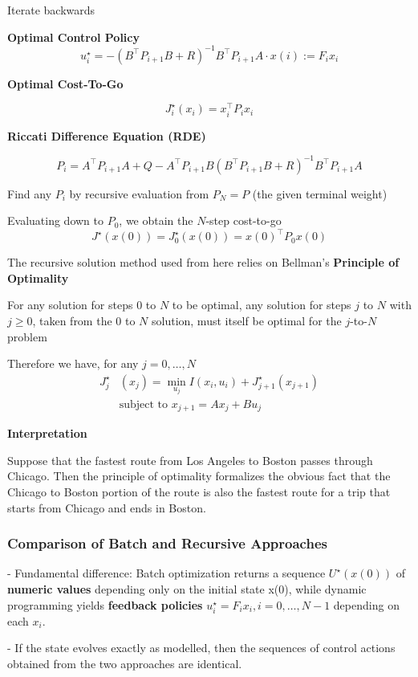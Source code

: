 Iterate backwards

\textbf{Optimal Control Policy}
\[
	u_i^\star =
	-(B^\top P_{i+1}B + R)^{-1}
	B^\top P_{i+1} A \cdot x(i)
	:= F_i x_i
\]

\textbf{Optimal Cost-To-Go}

\[
	J_i^\star(x_i) = x_i^\top P_i x_i
\]


\textbf{Riccati Difference Equation (RDE)}

\[
	\scriptstyle
	P_i = A^\top P_{i+1} A
	+ Q - A^\top P_{i+1} B
	(B^\top P_{i+1} B + R)^{-1}
	B^\top P_{i+1} A
\]

Find any $P_i$ by recursive evaluation from
$P_N = P$ (the given terminal weight)

Evaluating down to $P_0$, we obtain the $N$-step cost-to-go
\[
	J^\star(x(0)) = J_0^\star(x(0))=x(0)^\top P_0 x(0)
\]

The recursive solution method used from here relies on
Bellman’s \textbf{Principle of Optimality}

For any solution for steps $0$ to $N$ to be optimal,
any solution for steps $j$ to $N$ with $j\ge0$,
taken from the $0$ to $N$ solution,
must itself be optimal for the $j$-to-$N$ problem

Therefore we have, for any $j = 0,\dots,N$
\[\begin{aligned}
		J_j^\star & (x_j) = \min_{u_j}
		I(x_i,u_i) +J_{j+1}^\star(x_{j+1})
		\\
		          & \text{subject to  }
		x_{j+1}     = Ax_j+Bu_j
	\end{aligned} \]

\textbf{Interpretation}

Suppose that the fastest route from Los Angeles to Boston
passes through Chicago. Then the principle of optimality
formalizes the obvious fact that the Chicago to Boston
portion of the route is also the fastest route for a trip
that starts from Chicago and ends in Boston.

\subsubsection{Comparison of Batch and Recursive Approaches}

- Fundamental difference:
Batch optimization returns a sequence $U^\star(x(0))$
of \textbf{numeric values} depending only on the initial state x(0),
while dynamic programming yields \textbf{feedback policies}
$u_i^\star = F_i x_i, i = 0,\dots,N-1$ depending on each $x_i$.

- If the state evolves exactly as modelled,
then the sequences of control actions obtained from
the two approaches are identical.

